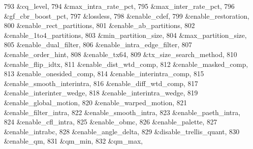 \begin{DoxyCodeInclude}
{{{{{{{793                                        &cq\_level,
794                                        &max\_intra\_rate\_pct,
795                                        &max\_inter\_rate\_pct,
796                                        &gf\_cbr\_boost\_pct,
797                                        &lossless,
798                                        &enable\_cdef,
799                                        &enable\_restoration,
800                                        &enable\_rect\_partitions,
801                                        &enable\_ab\_partitions,
802                                        &enable\_1to4\_partitions,
803                                        &min\_partition\_size,
804                                        &max\_partition\_size,
805                                        &enable\_dual\_filter,
806                                        &enable\_intra\_edge\_filter,
807                                        &enable\_order\_hint,
808                                        &enable\_tx64,
809                                        &tx\_size\_search\_method,
810                                        &enable\_flip\_idtx,
811                                        &enable\_dist\_wtd\_comp,
812                                        &enable\_masked\_comp,
813                                        &enable\_onesided\_comp,
814                                        &enable\_interintra\_comp,
815                                        &enable\_smooth\_interintra,
816                                        &enable\_diff\_wtd\_comp,
817                                        &enable\_interinter\_wedge,
818                                        &enable\_interintra\_wedge,
819                                        &enable\_global\_motion,
820                                        &enable\_warped\_motion,
821                                        &enable\_filter\_intra,
822                                        &enable\_smooth\_intra,
823                                        &enable\_paeth\_intra,
824                                        &enable\_cfl\_intra,
825                                        &enable\_obmc,
826                                        &enable\_palette,
827                                        &enable\_intrabc,
828                                        &enable\_angle\_delta,
829                                        &disable\_trellis\_quant,
830                                        &enable\_qm,
831                                        &qm\_min,
832                                        &qm\_max,
}}}}}}}
\end{DoxyCodeInclude}
